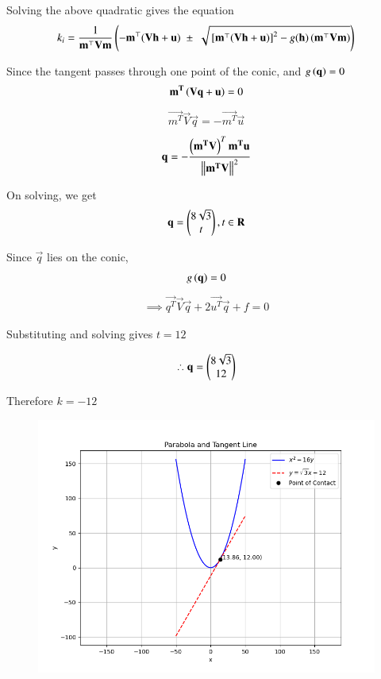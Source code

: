\documentclass[journal]{IEEEtran}
\begin{document}
Solving the above quadratic gives the equation
\begin{align}
k_i = \frac{1}{\mathbf{m}^{\top}\mathbf{V}\mathbf{m}}
\left(
    -\mathbf{m}^{\top} (\mathbf{V}\mathbf{h} + \mathbf{u})
    \;\pm\;
    \sqrt{ {}\left[\mathbf{m}^{\top}(\mathbf{V}\mathbf{h} + \mathbf{u})\right]^2
    - g(\mathbf{h}) \, (\mathbf{m}^{\top}\mathbf{V}\mathbf{m}) }
    \right)
\end{align}

Since the tangent passes through one point of the conic, and $g\left(\mathbf{q}\right)=0$
\begin{align}
\mathbf{m^T}\left(\mathbf{\mathbf{V}\mathbf{q} + \mathbf{u}}\right) = 0
\end{align}
\begin{align}
\vec{m^T}\vec{V}\vec{q} = -\vec{m^T}\vec{u}
\end{align}
\begin{align}
\mathbf{q} = -\frac{\left(\mathbf{m^T}\mathbf{V}\right)^T\mathbf{m^T}\mathbf{u}}{\left\lVert\mathbf{m^T}\mathbf{V}\right\rVert^2}
\end{align}

On solving, we get
\begin{align}
\mathbf{q} = \begin{pmatrix}8\sqrt{3} \\ t\end{pmatrix}, t \in \mathbf{R}
\end{align}

Since $\vec{q}$ lies on the conic, 
\begin{align}
g\left(\mathbf{\mathbf{q}}\right) = 0
\end{align}
\begin{align}
\implies \vec{q^T}\vec{V}\vec{q} + 2\vec{u^T}\vec{q} + f = 0
\end{align}

Substituting and solving gives $t=12$

\begin{align}
\therefore \mathbf{q} = \begin{pmatrix}8\sqrt{3} \\ 12\end{pmatrix}
\end{align}

Therefore $k = -12$


\begin{figure}[h!]
    \centering
    \includegraphics[height=0.5\textheight, keepaspectratio]{figs/Figure_1.png}
    \label{figure_1}
\end{figure}
\end{document}
